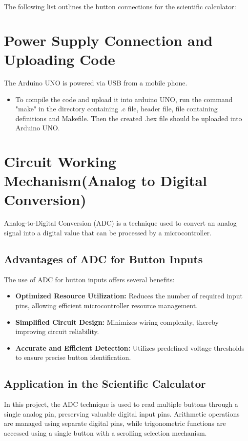 \documentclass[a4paper,12pt]{article}
\theoremstyle{remark}
\begin{document}
The following list outlines the button connections for the scientific calculator:




\section{Power Supply Connection and Uploading Code}
The Arduino UNO is powered via USB from a mobile phone.
\begin{itemize}
    \item To compile the code and upload it into arduino UNO, run the command "make" in the directory containing .c file, header file, file containing definitions and Makefile. Then the created .hex file should be uploaded into Arduino UNO. 
\end{itemize}

\section{Circuit Working Mechanism(Analog to Digital Conversion)}
Analog-to-Digital Conversion (ADC) is a technique used to convert an analog signal into a digital value that can be processed by a microcontroller.
\subsection{Advantages of ADC for Button Inputs}
The use of ADC for button inputs offers several benefits:
\begin{itemize}
    \item \textbf{Optimized Resource Utilization:} Reduces the number of required input pins, allowing efficient microcontroller resource management.
    \item \textbf{Simplified Circuit Design:} Minimizes wiring complexity, thereby improving circuit reliability.
    \item \textbf{Accurate and Efficient Detection:} Utilizes predefined voltage thresholds to ensure precise button identification.
\end{itemize}

\subsection{Application in the Scientific Calculator}
In this project, the ADC technique is used to read multiple buttons through a single analog pin, preserving valuable digital input pins. Arithmetic operations are managed using separate digital pins, while trigonometric functions are accessed using a single button with a scrolling selection mechanism.
\end{document}
